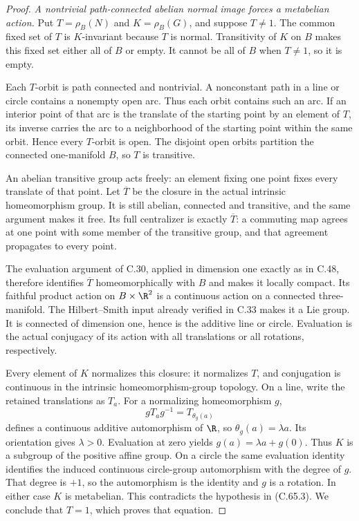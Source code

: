\begin{proof}
\emph{A nontrivial path-connected abelian normal image forces
a metabelian action.}
Put $T=\rho_B(N)$ and $K=\rho_B(G)$, and
suppose $T\ne1$. The common fixed set of
$T$ is $K$-invariant because $T$ is normal.
Transitivity of $K$ on $B$ makes this fixed
set either all of $B$ or empty. It cannot
be all of $B$ when $T\ne1$, so it is empty.

Each $T$-orbit is path connected and nontrivial.
A nonconstant path in a line or circle contains
a nonempty open arc. Thus each orbit contains
such an arc. If an interior point of that
arc is the translate of the starting point
by an element of $T$, its inverse carries
the arc to a neighborhood of the starting
point within the same orbit. Hence every
$T$-orbit is open. The disjoint open orbits
partition the connected one-manifold $B$,
so $T$ is transitive.

An abelian transitive group acts freely:
an element fixing one point fixes every
translate of that point. Let $\overline T$
be the closure in the actual intrinsic
homeomorphism group. It is still abelian,
connected and transitive, and the same
argument makes it free. Its full centralizer
is exactly $\overline T$: a commuting map
agrees at one point with some member of the
transitive group, and that agreement
propagates to every point.

The evaluation argument of C.30, applied
in dimension one exactly as in C.48,
therefore identifies $\overline T$
homeomorphically with $B$ and makes it
locally compact. Its faithful product
action on $B\times\R^2$ is a continuous
action on a connected three-manifold.
The Hilbert--Smith input already verified
in C.33 makes it a Lie group.
It is connected of dimension one, hence
is the additive line or circle. Evaluation
is the actual conjugacy of its action
with all translations or all rotations,
respectively.

Every element of $K$ normalizes this
closure: it normalizes $T$, and conjugation
is continuous in the intrinsic
homeomorphism-group topology. On a line,
write the retained translations as $T_a$.
For a normalizing homeomorphism $g$,
\[
                 gT_ag^{-1}=T_{\theta_g(a)}
                                                               \tag{C.65.6}
\]
defines a continuous additive automorphism
of $\R$, so $\theta_g(a)=\lambda a$.
Its orientation gives $\lambda>0$.
Evaluation at zero yields
$g(a)=\lambda a+g(0)$.
Thus $K$ is a subgroup of the positive
affine group. On a circle the same
evaluation identity identifies the
induced continuous circle-group
automorphism with the degree of $g$.
That degree is $+1$, so the automorphism
is the identity and $g$ is a rotation.
In either case $K$ is metabelian.
This contradicts the hypothesis in
(C.65.3). We conclude that $T=1$,
which proves that equation.


\end{proof}
